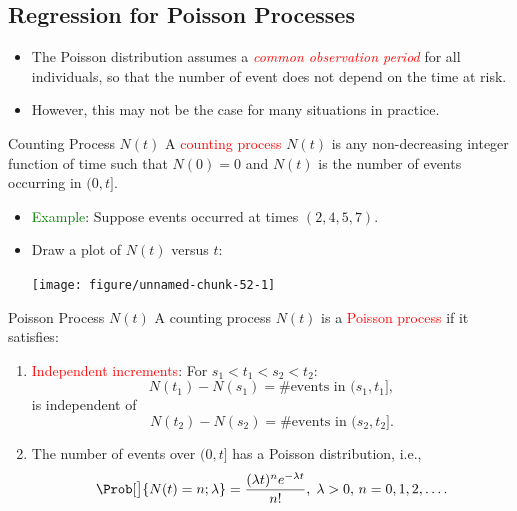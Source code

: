 \documentclass{article}\usepackage[]{graphicx}\usepackage[svgnames]{xcolor}
\newenvironment{knitrout}{}{} %
\begin{document}
\subsection*{Regression for Poisson Processes}
\begin{itemize}
      \item The Poisson distribution assumes a \textcolor{Red}{\emph{common observation period}} for all individuals,
            so that the number of event does not depend on the time at risk.
      \item However, this may not be the case for many situations in practice.
\end{itemize}
\begin{Regular}{Counting Process $ N(t) $}
      A \textcolor{Red}{counting process} $ N(t) $ is any non-decreasing integer function of time such that
      $ N(0)=0 $ and $ N(t) $ is the number of events occurring in $ (0,t] $.
\end{Regular}
\begin{itemize}
      \item \textcolor{Green}{Example}: Suppose events occurred at times $ (2,4,5,7) $.
      \item Draw a plot of $ N(t) $ versus $ t $:
\begin{knitrout}
\color{fgcolor}

{\centering \texttt{[image: figure/unnamed-chunk-52-1]} 

}


\end{knitrout}
\end{itemize}
\begin{Regular}{Poisson Process $ N(t) $}
      A counting process $ N(t) $ is a \textcolor{Red}{Poisson process} if it satisfies:
      \begin{enumerate}[1.]
            \item \textcolor{Red}{Independent increments}: For $ s_1<t_1<s_2<t_2 $:
                  \[ N(t_1)-N(s_1)=\text{\# events in $(s_1,t_1]$}, \]
                  is independent of
                  \[ N(t_2)-N(s_2)=\text{\# events in $(s_2,t_2]$}. \]
            \item The number of events over $ (0,t] $ has a Poisson distribution, i.e.,
                  \[ \Prob[\big]{N(t)=n;\lambda}=\frac{(\lambda t)^n e^{-\lambda t}}{n!},\; \lambda>0,\, n=0,1,2,\ldots.  \]
      \end{enumerate}
\end{Regular}
\end{document}
